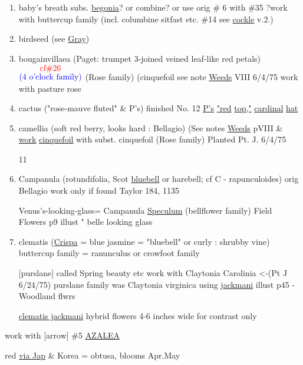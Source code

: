 \documentclass[a4paper,9pt]{article}
\begin{document}
\begin{enumerate}
\color{black}
\item baby's breath 
\color{red}
\tiny
{}
\footnotesize
subs. \ul{begonia}? or combine? or use orig \# 6 with \#35
\color{black}
?work with buttercup family 
(incl. columbine 
sitfast etc. 
\color{red}\#14
\color{black}
see \ul{cockle} v.2.)
\item birdseed (see \ul{Gray})


\item bougainvillaea (Paget: trumpet 3-joined
veined leaf-like red petals) {$\stackrel{\hbox{\color{red}{cf\#26}}}{\hbox{\color{blue}{(4 o'clock family)}}}$}
\color{red}
(Rose family) (cinquefoil see note \ul{Weeds} VIII 6/4/75 work with 
pasture rose
\color{black}
\item cactus ("rose-mauve fluted" \& P's)
\color{blue}
finished 
No. 12
\ul{P's} \ul{"red} \ul{top,"} \ul{cardinal} \ul{hat}
\color{black}
\item camellia (soft red berry, looks hard : Bellagio)
(See notes \ul{Weeds} 
pVIII \& \ul{work} \ul{cinquefoil} with %
subst. cinquefoil (Rose family) Planted Pt. J. 6/4/75

\color{blue}11
\color{black}
\item Campanula (rotundifolia, Scot \ul{bluebell}
 or harebell; cf C - rapunculoides)
\color{red}
orig 
Bellagio
work only if found
\color{blue}
Taylor
184, 1135 

Venus's-looking-glass= Campanula \ul{Speculum} (bellflower family)
\color{red}
Field Flowers p9 illust " belle looking glass
\color{black}
\item clematis (\ul{Crispa} \color{blue}= \color{black} blue jasmine \color{blue}= \color{black} "bluebell"
or curly : shrubby vine)
\color{blue}
buttercup 
family \color{red}= ranunculus or crowfoot family

[purslane]
\color{red}
called Spring 
beauty etc
work with Claytonia Carolinia <-(Pt J 6/24/75)
\tiny
\color{blue}purslane family
\normalsize
\color{red}
was Claytonia virginica using \ul{jackmani}
illust p45 - Woodland flwrs

\ul{clematis jackmani}
hybrid flowers
4-6 inches wide
for contrast only
\end{enumerate}


\color{red}
work with [arrow]
\#5 
\ul{AZALEA}

red \ul{via Jap} \color{blue} \& Korea 
\color{red}= obtusa,
blooms Apr.May
\end{document}
